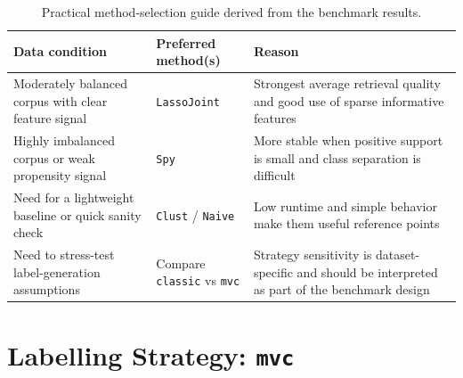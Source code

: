 \documentclass[11pt]{article}
\begin{document}
\begin{table}[H]
\caption{Practical method-selection guide derived from the benchmark results.}
\label{tab:method_selection_guide}
\centering
\small
\begin{tabularx}{\textwidth}{lXX}
\toprule
\textbf{Data condition} & \textbf{Preferred method(s)} & \textbf{Reason} \\
\midrule
Moderately balanced corpus with clear feature signal & \texttt{LassoJoint} & Strongest average retrieval quality and good use of sparse informative features \\
Highly imbalanced corpus or weak propensity signal & \texttt{Spy} & More stable when positive support is small and class separation is difficult \\
Need for a lightweight baseline or quick sanity check & \texttt{Clust} / \texttt{Naive} & Low runtime and simple behavior make them useful reference points \\
Need to stress-test label-generation assumptions & Compare \texttt{classic} vs \texttt{mvc} & Strategy sensitivity is dataset-specific and should be interpreted as part of the benchmark design \\
\bottomrule
\end{tabularx}
\end{table}

\section{Labelling Strategy: \texttt{mvc}}
\end{document}
